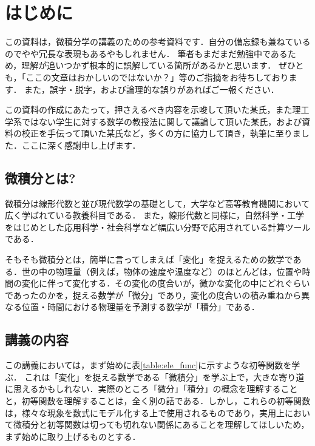 \chapter{はじめに}
この資料は，微積分学の講義のための参考資料です．自分の備忘録も兼ねているのでやや冗長な表現もあるやもしれません．
筆者もまだまだ勉強中であるため，理解が追いつかず根本的に誤解している箇所があるかと思います．
ぜひとも，「ここの文章はおかしいのではないか？」等のご指摘をお待ちしております．
また，誤字・脱字，および論理的な誤りがあればご一報ください．

この資料の作成にあたって，押さえるべき内容を示唆して頂いた某氏，また理工学系ではない学生に対する数学の教授法に関して議論して頂いた某氏，および資料の校正を手伝って頂いた某氏など，多くの方に協力して頂き，執筆に至りました．ここに深く感謝申し上げます．

\section{微積分とは?}
微積分は線形代数と並び現代数学の基礎として，大学など高等教育機関において広く学ばれている教養科目である．
また，線形代数と同様に，自然科学・工学をはじめとした応用科学・社会科学など幅広い分野で応用されている計算ツールである．

そもそも微積分とは，簡単に言ってしまえば「変化」を捉えるための数学である．世の中の物理量（例えば，物体の速度や温度など）のほとんどは，位置や時間の変化に伴って変化する．その変化の度合いが，微かな変化の中にどれぐらいであったのかを，捉える数学が「微分」であり，変化の度合いの積み重ねから異なる位置・時間における物理量を予測する数学が「積分」である．


\section{講義の内容}
この講義においては，まず始めに表\ref{table:ele_func}に示すような初等関数を学ぶ．
これは「変化」を捉える数学である「微積分」を学ぶ上で，大きな寄り道に思えるかもしれない．実際のところ「微分」「積分」の概念を理解することと，初等関数を理解することは，全く別の話である．しかし，これらの初等関数は，様々な現象を数式にモデル化する上で使用されるものであり，実用上において微積分と初等関数は切っても切れない関係にあることを理解してほしいため，まず始めに取り上げるものとする．

